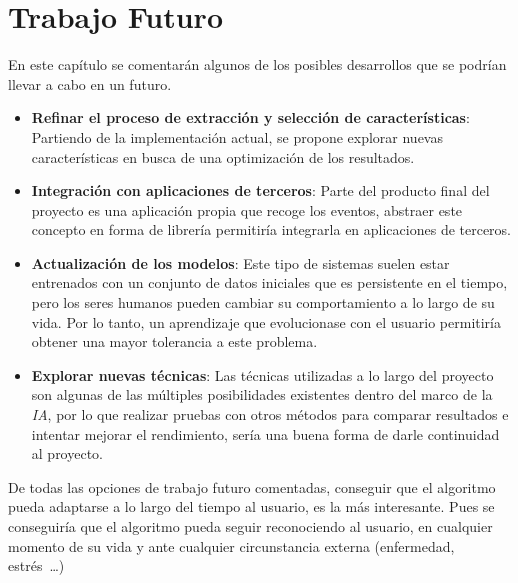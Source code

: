 \chapter{Trabajo Futuro}
\label{chap:futuro}

En este capítulo se comentarán algunos de los posibles desarrollos que se podrían llevar a cabo en un futuro. 

\begin{itemize}
    \item \textbf{Refinar el proceso de extracción y selección de características}: Partiendo de la implementación actual, se propone explorar nuevas características en busca de una optimización de los resultados.
    
    \item \textbf{Integración con aplicaciones de terceros}: Parte del producto final del proyecto es una aplicación propia que recoge los eventos, abstraer este concepto en forma de librería permitiría integrarla en aplicaciones de terceros.
    
    \item \textbf{Actualización de los modelos}: Este tipo de sistemas suelen estar entrenados con un conjunto de datos iniciales que es persistente en el tiempo, pero los seres humanos pueden cambiar su comportamiento a lo largo de su vida. Por lo tanto, un aprendizaje que evolucionase con el usuario permitiría obtener una mayor tolerancia a este problema.
    
    \item \textbf{Explorar nuevas técnicas}: Las técnicas utilizadas a lo largo del proyecto son algunas de las múltiples posibilidades existentes dentro del marco de la \textit{IA}, por lo que realizar pruebas con otros métodos para comparar resultados e intentar mejorar el rendimiento, sería una buena forma de darle continuidad al proyecto.
    

\end{itemize}

De todas las opciones de trabajo futuro comentadas, conseguir que el algoritmo pueda adaptarse a lo largo del tiempo al usuario, es la más interesante. Pues se conseguiría que el algoritmo pueda seguir reconociendo al usuario, en cualquier momento de su vida y ante cualquier circunstancia externa (enfermedad, estrés~\dots)
